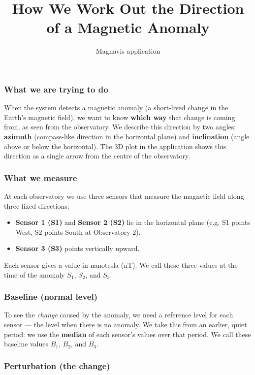 \documentclass[11pt]{article}
\title{How We Work Out the Direction of a Magnetic Anomaly}
\author{Magnavis application}
\date{}
\begin{document}
\maketitle

\subsubsection{\textbf{What we are trying to do}}

When the system detects a magnetic anomaly (a short-lived change in the Earth's magnetic field), we want to know \textbf{which way} that change is coming from, as seen from the observatory. We describe this direction by two angles: \textbf{azimuth} (compass-like direction in the horizontal plane) and \textbf{inclination} (angle above or below the horizontal). The 3D plot in the application shows this direction as a single arrow from the centre of the observatory.

\subsubsection{\textbf{What we measure}}

At each observatory we use three sensors that measure the magnetic field along three fixed directions:
\begin{itemize}
  \item \textbf{Sensor 1 (S1)} and \textbf{Sensor 2 (S2)} lie in the horizontal plane (e.g. S1 points West, S2 points South at Observatory 2).
  \item \textbf{Sensor 3 (S3)} points vertically upward.
\end{itemize}
Each sensor gives a value in nanotesla (nT). We call these three values at the time of the anomaly \(S_1\), \(S_2\), and \(S_3\).

\subsubsection{\textbf{Baseline (normal level)}}

To see the \emph{change} caused by the anomaly, we need a reference level for each sensor — the level when there is no anomaly. We take this from an earlier, quiet period: we use the \textbf{median} of each sensor's values over that period. We call these baseline values \(B_1\), \(B_2\), and \(B_3\).

\subsubsection{\textbf{Perturbation (the change)}}
\end{document}
